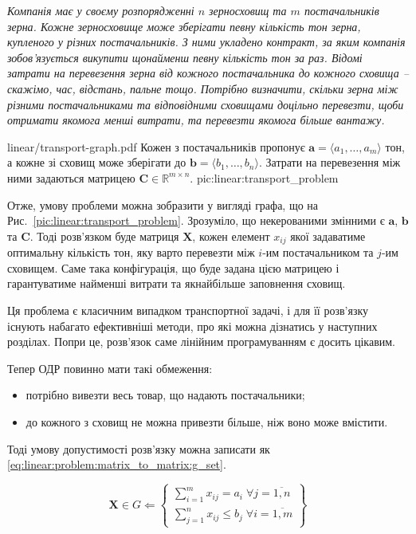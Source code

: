 \documentclass[\main/book.tex]{subfiles}
\begin{document}
\textit{Компанія має у своєму розпорядженні $n$ зерносховищ та $m$ постачальників зерна. Кожне зерносховище може зберігати певну кількість тон зерна, купленого у різних постачальників. З ними укладено контракт, за яким компанія зобов'язується викупити щонайменш певну кількість тон за раз. Відомі затрати на перевезення зерна від кожного постачальника до кожного сховища -- скажімо, час, відстань, пальне тощо. Потрібно визначити, скільки зерна між різними постачальниками та відповідними сховищами доцільно перевезти, щоби отримати якомога менші витрати, та перевезти якомога більше вантажу.}

\illustration
 {linear/transport-graph.pdf}
 {Кожен з постачальників пропонує $\mathbf{a} = {\langle a_1, \ldots, a_m \rangle}$ тон, а кожне зі сховищ може зберігати до $\mathbf{b} = {\langle b_1, \ldots, b_n \rangle}$. Затрати на перевезення між ними задаються матрицею $\mathbf{C} \in \mathbb{R}^{m \times n}$.}
 {pic:linear:transport_problem}

Отже, умову проблеми можна зобразити у вигляді графа, що на Рис.~\ref{pic:linear:transport_problem}. Зрозуміло, що некерованими змінними є $\mathbf{a}$, $\mathbf{b}$ та $\mathbf{C}$. Тоді розв'язком буде матриця $\mathbf{X}$, кожен елемент $x_{ij}$ якої задаватиме \flqq{}оптимальну\frqq{} кількість тон, яку варто перевезти між $i$-им постачальником та $j$-им сховищем. Саме така конфігурація, що буде задана цією матрицею і гарантуватиме найменші витрати та якнайбільше заповнення сховищ.

\begin{note}
 Ця проблема є класичним випадком транспортної задачі, і для її розв'язку існують набагато ефективніші методи, про які можна дізнатись у наступних розділах. Попри це, розв'язок саме лінійним програмуванням є досить цікавим.
\end{note}

Тепер ОДР повинно мати такі обмеження:

\begin{itemize}
 \item потрібно вивезти весь товар, що надають постачальники;
 \item до кожного з сховищ не можна привезти більше, ніж воно може вмістити.
\end{itemize}

Тоді умову допустимості розв'язку можна записати як \ref{eq:linear:problem:matrix_to_matrix:g_set}.

\begin{equation}
 \mathbf{X} \in G \Leftarrow \left\{
 \begin{array}{l}
  \displaystyle
  \sum_{i=1}^m x_{ij} = a_i\; \forall j = \overline{1, n} \\
  \displaystyle
  \sum_{j=1}^n x_{ij} \leq b_j\; \forall i = \overline{1, m}
 \end{array}
 \right\}
 \label{eq:linear:problem:matrix_to_matrix:g_set}
\end{equation}
\end{document}

